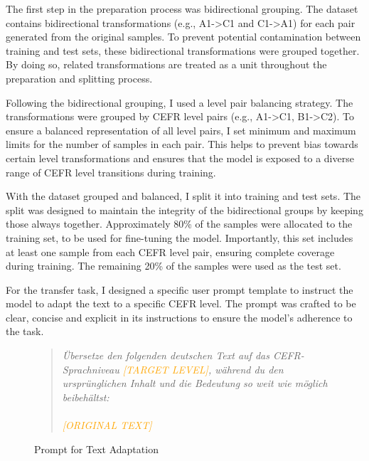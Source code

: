 The first step in the preparation process was bidirectional grouping. The dataset contains bidirectional transformations (e.g., A1->C1 and C1->A1) for each pair generated from the original samples. To prevent potential contamination between training and test sets, these bidirectional transformations were grouped together. By doing so, related transformations are treated as a unit throughout the preparation and splitting process.

Following the bidirectional grouping, I used a level pair balancing strategy. The transformations were grouped by CEFR level pairs (e.g., A1->C1, B1->C2). To ensure a balanced representation of all level pairs, I set minimum and maximum limits for the number of samples in each pair. This helps to prevent bias towards certain level transformations and ensures that the model is exposed to a diverse range of CEFR level transitions during training.

With the dataset grouped and balanced, I split it into training and test sets. The split was designed to maintain the integrity of the bidirectional groups by keeping those always together. Approximately 80\% of the samples were allocated to the training set, to be used for fine-tuning the model. Importantly, this set includes at least one sample from each CEFR level pair, ensuring complete coverage during training. The remaining 20\% of the samples were used as the test set.

For the transfer task, I designed a specific user prompt template to instruct the model to adapt the text to a specific CEFR level. The prompt was crafted to be clear, concise and explicit in its instructions to ensure the model's adherence to the task.
\captionsetup{labelformat=prompt}
\begin{figure}[h]
    \begin{quotation}
        \textit{
            Übersetze den folgenden deutschen Text auf das CEFR-Sprachniveau \textcolor{orange}{[TARGET LEVEL]}, während du den ursprünglichen Inhalt und die Bedeutung so weit wie möglich beibehältst: \\ \\
            \textcolor{orange}{[ORIGINAL TEXT]}
        }
    \end{quotation}
    \caption{Prompt for Text Adaptation}
    \label{qu:single_adaptation_prompt}
\end{figure}
\captionsetup{labelformat=default}

